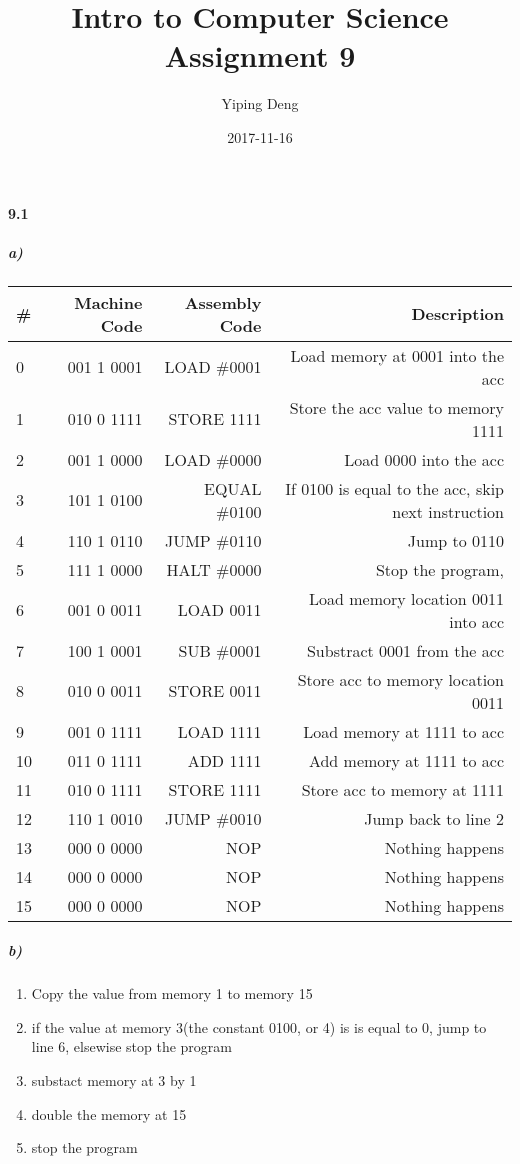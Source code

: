 \documentclass{article}
\title{Intro to Computer Science Assignment 9}
\date{2017-11-16}
\author{Yiping Deng}
\begin{document}
\maketitle
\paragraph{9.1}
\subparagraph{a)}
\begin{center}
    \begin{tabular}{|l|r|r|r|}
        \hline
        \# & Machine Code & Assembly Code & Description \\
        \hline
        0 & 001 1 0001 & LOAD \#0001 & Load memory at 0001 into the acc \\
        1 & 010 0 1111 & STORE 1111 & Store the acc value to memory 1111 \\
        2 & 001 1 0000 & LOAD \#0000 & Load 0000 into the acc \\
        3 & 101 1 0100 & EQUAL \#0100 & If 0100 is equal to the acc, skip next instruction \\
        4 & 110 1 0110 & JUMP \#0110 & Jump to 0110 \\
        5 & 111 1 0000 & HALT \#0000 & Stop the program, \\
        6 & 001 0 0011 & LOAD 0011 & Load memory location 0011 into acc \\
        7 & 100 1 0001 & SUB \#0001 & Substract 0001 from the acc \\
        8 & 010 0 0011 & STORE 0011 & Store acc to memory location 0011 \\
        9 & 001 0 1111 & LOAD 1111 & Load memory at 1111 to acc \\
        10 & 011 0 1111 & ADD 1111 & Add memory at 1111 to acc \\
        11 & 010 0 1111 & STORE 1111 & Store acc to memory at 1111 \\
        12 & 110 1 0010 & JUMP \#0010 & Jump back to line 2 \\
        13 & 000 0 0000 & NOP & Nothing happens \\
        14 & 000 0 0000 & NOP & Nothing happens \\
        15 & 000 0 0000 & NOP & Nothing happens\\
        \hline
    \end{tabular}
\end{center}
\subparagraph{b)}
\begin{enumerate}
    \item Copy the value from memory 1 to memory 15
    \item if the value at memory 3(the constant 0100, or 4) is is equal to 0, jump to line 6, elsewise stop the program
    \item substact memory at 3 by 1
    \item double the memory at 15
    \item stop the program
\end{enumerate}
\end{document}
